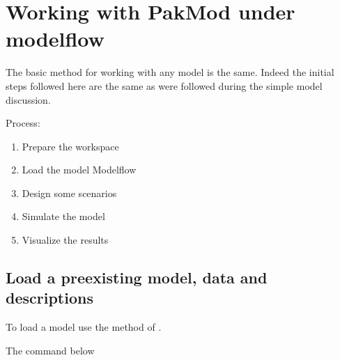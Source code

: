 \documentclass[letterpaper,10pt,english]{jupyterBook}
\begin{document}
\section{Working with PakMod under modelflow}
\label{\detokenize{content/05_WBModels/LoadingWBModel:working-with-pakmod-under-modelflow}}
\sphinxAtStartPar
The basic method for working with any model is the same. Indeed the initial steps followed here are the same as were followed during the simple model discussion.

\sphinxAtStartPar
Process:
\begin{enumerate}
%
\item {} 
\sphinxAtStartPar
Prepare the workspace

\item {} 
\sphinxAtStartPar
Load the model Modelflow

\item {} 
\sphinxAtStartPar
Design some scenarios

\item {} 
\sphinxAtStartPar
Simulate the model

\item {} 
\sphinxAtStartPar
Visualize the results

\end{enumerate}


\subsection{Load a pre\sphinxhyphen{}existing model, data and descriptions}
\label{\detokenize{content/05_WBModels/LoadingWBModel:load-a-pre-existing-model-data-and-descriptions}}
\sphinxAtStartPar
To load a model use the  method of .

\sphinxAtStartPar
The command below

\begin{sphinxVerbatim}[commandchars=\\\{\}]
    
\end{sphinxVerbatim}
\end{document}
